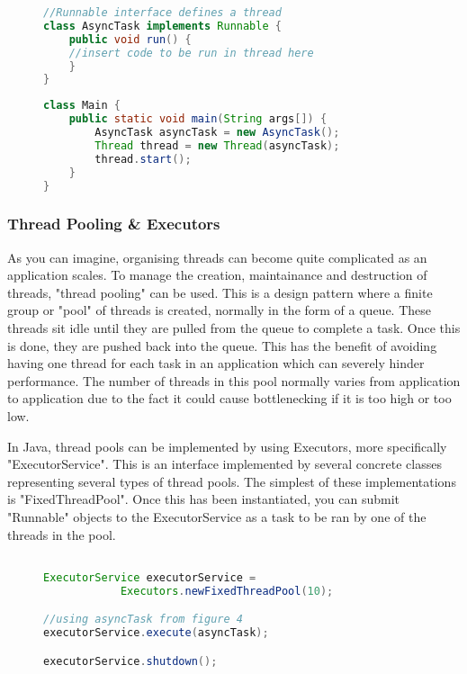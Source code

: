 \documentclass[]{report}
\begin{document}
\begin{figure}
\caption{}
\begin{lstlisting}[language=Java,frame=single]
//Runnable interface defines a thread
class AsyncTask implements Runnable {
	public void run() {
	//insert code to be run in thread here
	}
}
\end{lstlisting}
\end{figure}

\newpage
\begin{figure}
\caption{}
\begin{lstlisting}[language=Java,frame=single]
class Main {
	public static void main(String args[]) { 
		AsyncTask asyncTask = new AsyncTask();
		Thread thread = new Thread(asyncTask);
		thread.start();
	}
}
\end{lstlisting}
\end{figure}

\subsubsection{Thread Pooling \& Executors}
As you can imagine, organising threads can become quite complicated as an application scales. To manage the creation, maintainance and destruction of threads, "thread pooling" can be used. This is a design pattern where a finite group or "pool" of threads is created, normally in the form of a queue. These threads sit idle until they are pulled from the queue to complete a task. Once this is done, they are pushed back into the queue. This has the benefit of avoiding having one thread for each task in an application which can severely hinder performance. The number of threads in this pool normally varies from application to application due to the fact it could cause bottlenecking if it is too high or too low. 

In Java, thread pools can be implemented by using Executors, more specifically "ExecutorService". This is an interface implemented by several concrete classes representing several types of thread pools. The simplest of these implementations is "FixedThreadPool". Once this has been instantiated, you can submit "Runnable" objects to the ExecutorService as a task to be ran by one of the threads in the pool.

\begin{figure}
\caption{}
\begin{lstlisting}[language=Java,frame=single]

ExecutorService executorService = 
			Executors.newFixedThreadPool(10);

//using asyncTask from figure 4
executorService.execute(asyncTask);

executorService.shutdown();
\end{lstlisting}
\end{figure}
\end{document}
